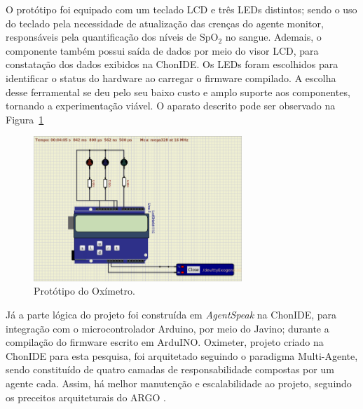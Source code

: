 O protótipo foi equipado com um teclado LCD e três LEDs distintos; sendo o uso do teclado pela necessidade de atualização das crenças do agente monitor, responsáveis pela quantificação dos níveis de SpO$_2$ no sangue. Ademais, o componente também possui saída de dados por meio do visor LCD, para constatação dos dados exibidos na ChonIDE. Os LEDs foram escolhidos para identificar o status do hardware ao carregar o firmware compilado.
A escolha desse ferramental se deu pelo seu baixo custo e amplo suporte aos componentes, tornando a experimentação viável. O aparato descrito pode ser observado na Figura~\ref{fig:fig5}

\begin{figure}[H]
  \centering
  \includegraphics[width=0.7\textwidth]{assets/img/Oximeter.png}
  \caption{Protótipo do Oxímetro.}
  \label{fig:fig5}
\end{figure}

Já a parte lógica do projeto foi construída em \textit{AgentSpeak} na ChonIDE, para integração com o microcontrolador Arduino, por meio do Javino; durante a compilação do firmware escrito em ArduINO. Oximeter, projeto criado na ChonIDE para esta pesquisa, foi arquitetado seguindo o paradigma Multi-Agente, sendo constituído de quatro camadas de responsabilidade compostas por um agente cada. Assim, há melhor manutenção e escalabilidade ao projeto, seguindo os preceitos arquiteturais do ARGO \cite{pantoja2016argo}.

